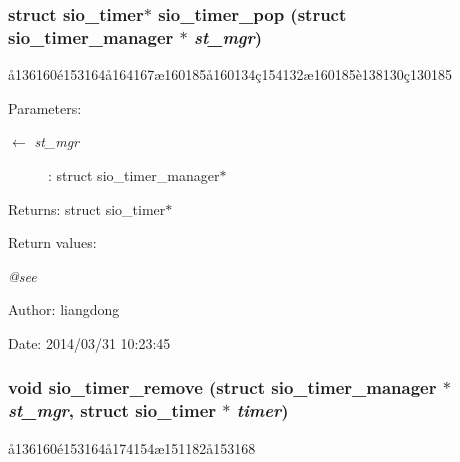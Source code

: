 \subsubsection{\setlength{\rightskip}{0pt plus 5cm}struct sio\_\-timer$\ast$ sio\_\-timer\_\-pop (struct sio\_\-timer\_\-manager $\ast$ {\em st\_\-mgr})}\label{sio__timer_8c_a11}


\aa{}136160\'{e}153164\aa{}164167\ae{}160185\aa{}160134\c{c}154132\ae{}160185\`{e}138130\c{c}130185 

\begin{Desc}
\item[Parameters:]
\begin{description}
\item[\mbox{$\leftarrow$} {\em st\_\-mgr}]: struct sio\_\-timer\_\-manager$\ast$ \end{description}
\end{Desc}
\begin{Desc}
\item[Returns:]struct sio\_\-timer$\ast$ \end{Desc}
\begin{Desc}
\item[Return values:]
\begin{description}
\item[{\em @see}]\end{description}
\end{Desc}
\begin{Desc}
\item[Author:]liangdong \end{Desc}
\begin{Desc}
\item[Date:]2014/03/31 10:23:45 \end{Desc}
\subsubsection{\setlength{\rightskip}{0pt plus 5cm}void sio\_\-timer\_\-remove (struct sio\_\-timer\_\-manager $\ast$ {\em st\_\-mgr}, struct sio\_\-timer $\ast$ {\em timer})}\label{sio__timer_8c_a9}


\aa{}136160\'{e}153164\aa{}174154\ae{}151182\aa{}153168 

